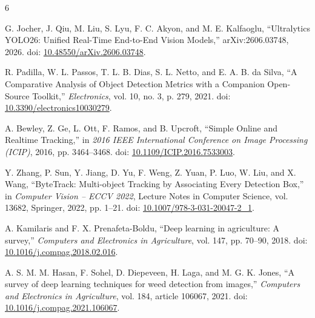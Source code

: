\documentclass[10pt,twocolumn]{article}
\begin{document}
{\small
\begin{thebibliography}{6}

G. Jocher, J. Qiu, M. Liu, S. Lyu, F. C. Akyon, and M. E. Kalfaoglu, ``Ultralytics YOLO26: Unified Real-Time End-to-End Vision Models,'' arXiv:2606.03748, 2026. doi: \href{https://doi.org/10.48550/arXiv.2606.03748}{10.48550/arXiv.2606.03748}.

R. Padilla, W. L. Passos, T. L. B. Dias, S. L. Netto, and E. A. B. da Silva, ``A Comparative Analysis of Object Detection Metrics with a Companion Open-Source Toolkit,'' \textit{Electronics}, vol. 10, no. 3, p. 279, 2021. doi: \href{https://doi.org/10.3390/electronics10030279}{10.3390/electronics10030279}.

A. Bewley, Z. Ge, L. Ott, F. Ramos, and B. Upcroft, ``Simple Online and Realtime Tracking,'' in \textit{2016 IEEE International Conference on Image Processing (ICIP)}, 2016, pp. 3464--3468. doi: \href{https://doi.org/10.1109/ICIP.2016.7533003}{10.1109/ICIP.2016.7533003}.

Y. Zhang, P. Sun, Y. Jiang, D. Yu, F. Weng, Z. Yuan, P. Luo, W. Liu, and X. Wang, ``ByteTrack: Multi-object Tracking by Associating Every Detection Box,'' in \textit{Computer Vision -- ECCV 2022}, Lecture Notes in Computer Science, vol. 13682, Springer, 2022, pp. 1--21. doi: \href{https://doi.org/10.1007/978-3-031-20047-2_1}{10.1007/978-3-031-20047-2\_1}.

A. Kamilaris and F. X. Prenafeta-Boldu, ``Deep learning in agriculture: A survey,'' \textit{Computers and Electronics in Agriculture}, vol. 147, pp. 70--90, 2018. doi: \href{https://doi.org/10.1016/j.compag.2018.02.016}{10.1016/j.compag.2018.02.016}.

A. S. M. M. Hasan, F. Sohel, D. Diepeveen, H. Laga, and M. G. K. Jones, ``A survey of deep learning techniques for weed detection from images,'' \textit{Computers and Electronics in Agriculture}, vol. 184, article 106067, 2021. doi: \href{https://doi.org/10.1016/j.compag.2021.106067}{10.1016/j.compag.2021.106067}.

\end{thebibliography}
}
\end{document}
